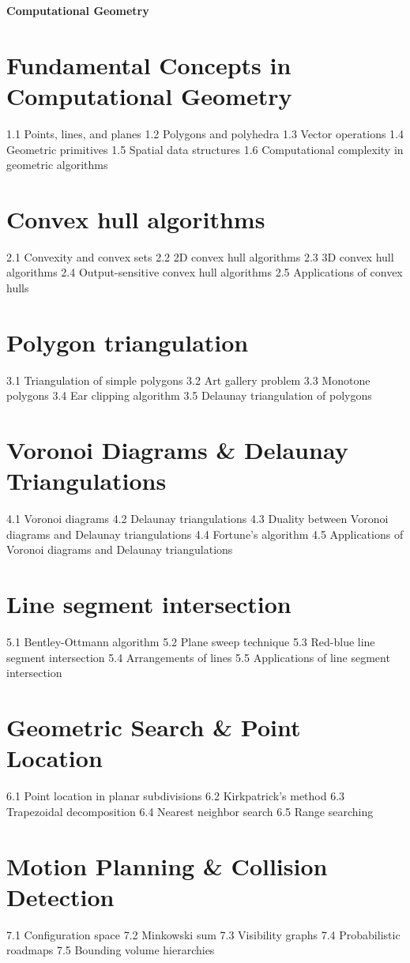 {\LARGE \bf{Computational Geometry}}
\section{Fundamental Concepts in Computational Geometry}
1.1 Points, lines, and planes
1.2 Polygons and polyhedra
1.3 Vector operations
1.4 Geometric primitives
1.5 Spatial data structures
1.6 Computational complexity in geometric algorithms
\section{Convex hull algorithms}
2.1 Convexity and convex sets
2.2 2D convex hull algorithms
2.3 3D convex hull algorithms
2.4 Output-sensitive convex hull algorithms
2.5 Applications of convex hulls
\section{Polygon triangulation}
3.1 Triangulation of simple polygons
3.2 Art gallery problem
3.3 Monotone polygons
3.4 Ear clipping algorithm
3.5 Delaunay triangulation of polygons
\section{Voronoi Diagrams \& Delaunay Triangulations}
4.1 Voronoi diagrams
4.2 Delaunay triangulations
4.3 Duality between Voronoi diagrams and Delaunay triangulations
4.4 Fortune's algorithm
4.5 Applications of Voronoi diagrams and Delaunay triangulations
\section{Line segment intersection}
5.1 Bentley-Ottmann algorithm
5.2 Plane sweep technique
5.3 Red-blue line segment intersection
5.4 Arrangements of lines
5.5 Applications of line segment intersection
\section{Geometric Search \& Point Location}
6.1 Point location in planar subdivisions
6.2 Kirkpatrick's method
6.3 Trapezoidal decomposition
6.4 Nearest neighbor search
6.5 Range searching
\section{Motion Planning \& Collision Detection}
7.1 Configuration space
7.2 Minkowski sum
7.3 Visibility graphs
7.4 Probabilistic roadmaps
7.5 Bounding volume hierarchies
